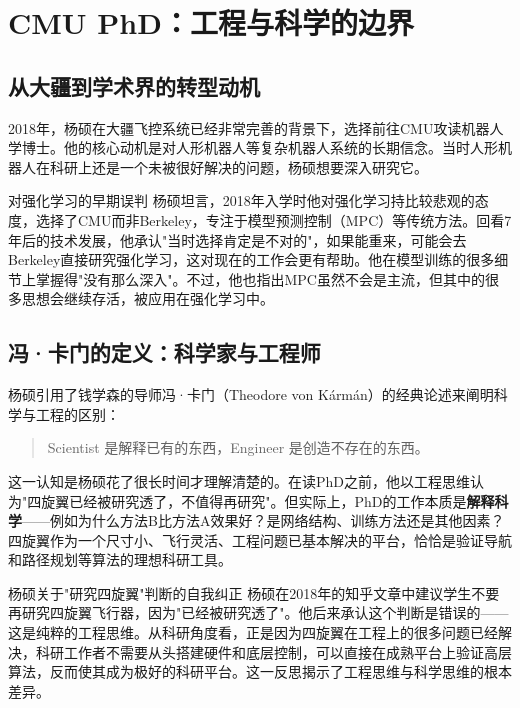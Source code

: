 \section{CMU PhD：工程与科学的边界}

\subsection{从大疆到学术界的转型动机}

2018年，杨硕在大疆飞控系统已经非常完善的背景下，选择前往CMU攻读机器人学博士。他的核心动机是对人形机器人等复杂机器人系统的长期信念。当时人形机器人在科研上还是一个未被很好解决的问题，杨硕想要深入研究它。

\begin{warningbox}{对强化学习的早期误判}
杨硕坦言，2018年入学时他对强化学习持比较悲观的态度，选择了CMU而非Berkeley，专注于模型预测控制（MPC）等传统方法。回看7年后的技术发展，他承认"当时选择肯定是不对的"，如果能重来，可能会去Berkeley直接研究强化学习，这对现在的工作会更有帮助。他在模型训练的很多细节上掌握得"没有那么深入"。不过，他也指出MPC虽然不会是主流，但其中的很多思想会继续存活，被应用在强化学习中。
\end{warningbox}

\subsection{冯·卡门的定义：科学家与工程师}

杨硕引用了钱学森的导师冯·卡门（Theodore von K\'arm\'an）的经典论述来阐明科学与工程的区别：

\begin{quote}
Scientist 是解释已有的东西，Engineer 是创造不存在的东西。
\end{quote}

这一认知是杨硕花了很长时间才理解清楚的。在读PhD之前，他以工程思维认为"四旋翼已经被研究透了，不值得再研究"。但实际上，PhD的工作本质是\textbf{解释科学}——例如为什么方法B比方法A效果好？是网络结构、训练方法还是其他因素？四旋翼作为一个尺寸小、飞行灵活、工程问题已基本解决的平台，恰恰是验证导航和路径规划等算法的理想科研工具。

\begin{knowledgebox}{杨硕关于"研究四旋翼"判断的自我纠正}
杨硕在2018年的知乎文章中建议学生不要再研究四旋翼飞行器，因为"已经被研究透了"。他后来承认这个判断是错误的——这是纯粹的工程思维。从科研角度看，正是因为四旋翼在工程上的很多问题已经解决，科研工作者不需要从头搭建硬件和底层控制，可以直接在成熟平台上验证高层算法，反而使其成为极好的科研平台。这一反思揭示了工程思维与科学思维的根本差异。
\end{knowledgebox}

